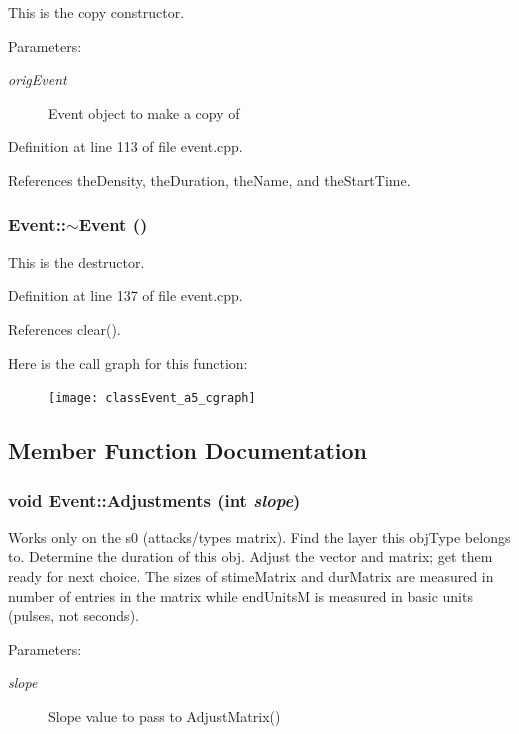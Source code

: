 This is the copy constructor. \begin{Desc}
\item[Parameters:]
\begin{description}
\item[{\em orig\-Event}]Event object to make a copy of \end{description}
\end{Desc}


Definition at line 113 of file event.cpp.

References the\-Density, the\-Duration, the\-Name, and the\-Start\-Time.
\subsubsection{\setlength{\rightskip}{0pt plus 5cm}Event::$\sim${\bf Event} ()}\label{classEvent_a5}


This is the destructor. 

Definition at line 137 of file event.cpp.

References clear().

Here is the call graph for this function:\begin{figure}[H]
\begin{center}
\leavevmode
\texttt{[image: classEvent\_a5\_cgraph]}
\end{center}
\end{figure}


\subsection{Member Function Documentation}
\subsubsection{\setlength{\rightskip}{0pt plus 5cm}void Event::Adjustments (int {\em slope})}\label{classEvent_a54}


Works only on the s0 (attacks/types matrix). Find the layer this obj\-Type belongs to. Determine the duration of this obj. Adjust the vector and matrix; get them ready for next choice. The sizes of stime\-Matrix and dur\-Matrix are measured in number of entries in the matrix while end\-Units\-M is measured in basic units (pulses, not seconds). \begin{Desc}
\item[Parameters:]
\begin{description}
\item[{\em slope}]Slope value to pass to Adjust\-Matrix() \end{description}
\end{Desc}


